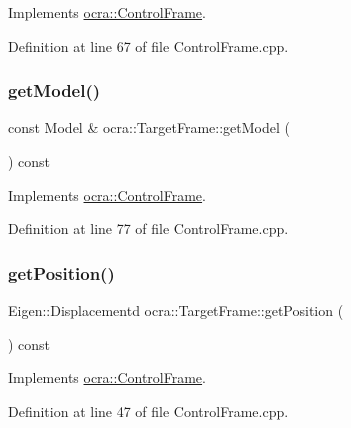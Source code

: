 Implements \hyperlink{classocra_1_1ControlFrame_a14e0b855979be5dbd360314f25191e77}{ocra\+::\+Control\+Frame}.



Definition at line 67 of file Control\+Frame.\+cpp.

\hypertarget{classocra_1_1TargetFrame_acfd238567f0cfb9e6107cd17103ec6ea}{}\label{classocra_1_1TargetFrame_acfd238567f0cfb9e6107cd17103ec6ea} 
\subsubsection{\texorpdfstring{get\+Model()}{getModel()}}
{\footnotesize\ttfamily const Model \& ocra\+::\+Target\+Frame\+::get\+Model (\begin{DoxyParamCaption}{ }\end{DoxyParamCaption}) const\hspace{0.3cm}{\ttfamily [virtual]}}



Implements \hyperlink{classocra_1_1ControlFrame_ab8a1e5e3d96d7524112b4c88bf0bc5ee}{ocra\+::\+Control\+Frame}.



Definition at line 77 of file Control\+Frame.\+cpp.

\hypertarget{classocra_1_1TargetFrame_ab2f3bd3f05be243a5d9e2123b943986d}{}\label{classocra_1_1TargetFrame_ab2f3bd3f05be243a5d9e2123b943986d} 
\subsubsection{\texorpdfstring{get\+Position()}{getPosition()}}
{\footnotesize\ttfamily Eigen\+::\+Displacementd ocra\+::\+Target\+Frame\+::get\+Position (\begin{DoxyParamCaption}{ }\end{DoxyParamCaption}) const\hspace{0.3cm}{\ttfamily [virtual]}}



Implements \hyperlink{classocra_1_1ControlFrame_aaadbbfbcdd5b8e197a0f181ffb2fdcbe}{ocra\+::\+Control\+Frame}.



Definition at line 47 of file Control\+Frame.\+cpp.

